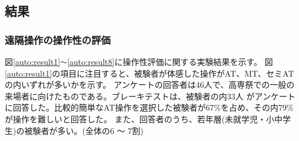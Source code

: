 \clearpage
\subsection{結果}
\subsubsection{遠隔操作の操作性の評価}
図\ref{auto:result1}\verb|～|\ref{auto:result8}に操作性評価に関する実験結果を示す。
図\ref{auto:result1}の項目に注目すると、被験者が体感した操作がAT、MT、セミATの内いずれが多いかを示す。
アンケートの回答者は46人で、高専祭での一般の来場者に向けたものである。ブレーキテストは、被験者の内33人
がアンケートに回答した。比較的簡単なAT操作を選択した被験者が67\%を占め、その内79\%が操作を難しいと回答した。
また、回答者のうち、若年層(未就学児・小中学生)の被験者が多い。(全体の6 ～ 7割)

